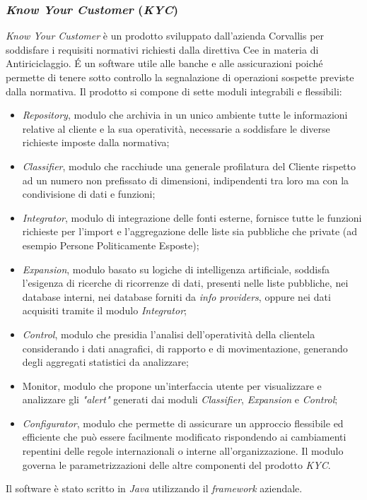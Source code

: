\subsubsection{\emph{Know Your Customer} (\emph{KYC})}
\label{1.2.5}
\emph{Know Your Customer} è un prodotto sviluppato dall'azienda Corvallis per soddisfare i requisiti normativi richiesti dalla direttiva Cee in materia di Antiriciclaggio. \'{E} un software utile alle banche e alle assicurazioni poiché permette di tenere sotto controllo la segnalazione di operazioni sospette previste dalla normativa. Il prodotto si compone di sette moduli integrabili e flessibili:
\begin{itemize}
\item \emph{Repository}, modulo che archivia in un unico ambiente tutte le informazioni relative al cliente e la sua operatività, necessarie a soddisfare le diverse richieste imposte dalla normativa;
\item \emph{Classifier}, modulo che racchiude una generale profilatura del Cliente rispetto ad un numero non prefissato di dimensioni, indipendenti tra loro ma con la condivisione di dati e funzioni;
\item \emph{Integrator}, modulo di integrazione delle fonti esterne, fornisce tutte le funzioni richieste per l'import e l'aggregazione delle liste sia pubbliche che private (ad esempio Persone Politicamente Esposte);
\item \emph{Expansion}, modulo basato su logiche di intelligenza artificiale, soddisfa l'esigenza di ricerche di ricorrenze di dati, presenti nelle liste pubbliche, nei database interni, nei database forniti da \emph{info providers}, oppure nei dati acquisiti tramite il modulo \emph{Integrator};
\item \emph{Control}, modulo che presidia l'analisi dell'operatività della clientela considerando i dati anagrafici, di rapporto e di movimentazione, generando degli aggregati statistici da analizzare;
\item Monitor, modulo che  propone un'interfaccia utente per visualizzare e analizzare gli \emph{"alert"} generati dai moduli \emph{Classifier}, \emph{Expansion} e \emph{Control};
\item \emph{Configurator}, modulo che permette di assicurare un approccio flessibile ed efficiente che può essere facilmente modificato rispondendo ai cambiamenti repentini delle regole internazionali o interne all'organizzazione. Il modulo governa le parametrizzazioni delle altre componenti del prodotto \emph{KYC}.
\end{itemize}
Il software è stato scritto in \emph{Java} utilizzando il \emph{framework} aziendale.
